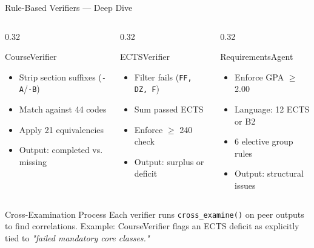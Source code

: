 \documentclass[aspectratio=169]{beamer}
\begin{document}
\begin{frame}{Rule-Based Verifiers — Deep Dive}
  \begin{columns}[T]
    \begin{column}{0.32\textwidth}
      \begin{block}{CourseVerifier}
        \scriptsize
        \begin{itemize}
          \item Strip section suffixes (\texttt{-A}/\texttt{-B})
          \item Match against 44 codes
          \item Apply 21 equivalencies
          \item Output: completed vs. missing
        \end{itemize}
      \end{block}
    \end{column}
    \begin{column}{0.32\textwidth}
      \begin{block}{ECTSVerifier}
        \scriptsize
        \begin{itemize}
          \item Filter fails (\texttt{FF, DZ, F})
          \item Sum passed ECTS
          \item Enforce $\geq$ 240 check
          \item Output: surplus or deficit
        \end{itemize}
      \end{block}
    \end{column}
    \begin{column}{0.32\textwidth}
      \begin{block}{RequirementsAgent}
        \scriptsize
        \begin{itemize}
          \item Enforce GPA $\geq$ 2.00
          \item Language: 12 ECTS or B2
          \item 6 elective group rules
          \item Output: structural issues
        \end{itemize}
      \end{block}
    \end{column}
  \end{columns}
  \vspace{0.8em}
  \begin{alertblock}{Cross-Examination Process}
    \small Each verifier runs \texttt{cross\_examine()} on peer outputs to find correlations. Example: CourseVerifier flags an ECTS deficit as explicitly tied to \textit{"failed mandatory core classes."}
  \end{alertblock}
\end{frame}
\end{document}
